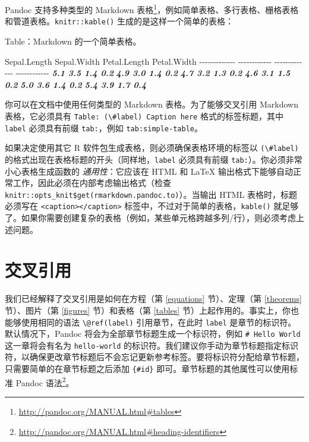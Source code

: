 \documentclass[
  12pt,
]{krantz}
\newenvironment{Shaded}{\begin{snugshade}}{\end{snugshade}}
\newcommand{\InformationTok}[1]{\textcolor[rgb]{0.56,0.35,0.01}{\textbf{\textit{#1}}}}
\newcommand{\NormalTok}[1]{#1}
\renewcommand{\href}[2]{#2\footnote{\url{#1}}}
\theoremstyle{definition}
\theoremstyle{definition}
\theoremstyle{definition}
\theoremstyle{definition}
\theoremstyle{remark}
\begin{document}
Pandoc 支持多种类型的 \href{http://pandoc.org/MANUAL.html\#tables}{Markdown 表格}，例如简单表格、多行表格、栅格表格和管道表格。\texttt{knitr::kable()} 生成的是这样一个简单的表格：

\begin{Shaded}
\begin{Highlighting}[]
\NormalTok{Table：Markdown 的一个简单表格。}

\NormalTok{ Sepal.Length   Sepal.Width   Petal.Length   Petal.Width}
\NormalTok{{-}{-}{-}{-}{-}{-}{-}{-}{-}{-}{-}{-}{-}  {-}{-}{-}{-}{-}{-}{-}{-}{-}{-}{-}{-}  {-}{-}{-}{-}{-}{-}{-}{-}{-}{-}{-}{-}{-}  {-}{-}{-}{-}{-}{-}{-}{-}{-}{-}{-}{-}}
\InformationTok{          5.1           3.5            1.4           0.2}
\InformationTok{          4.9           3.0            1.4           0.2}
\InformationTok{          4.7           3.2            1.3           0.2}
\InformationTok{          4.6           3.1            1.5           0.2}
\InformationTok{          5.0           3.6            1.4           0.2}
\InformationTok{          5.4           3.9            1.7           0.4}
\end{Highlighting}
\end{Shaded}

你可以在文档中使用任何类型的 Markdown 表格。为了能够交叉引用 Markdown 表格，它必须具有 \texttt{Table:\ (\textbackslash{}\#label)\ Caption\ here} 格式的标签标题，其中 \texttt{label} 必须具有前缀 \texttt{tab:}，例如 \texttt{tab:simple-table}。

如果决定使用其它 R 软件包生成表格，则必须确保表格环境的标签以 \texttt{(\textbackslash{}\#label)} 的格式出现在表格标题的开头（同样地，\texttt{label} 必须具有前缀 \texttt{tab:}）。你必须非常小心表格生成函数的 \emph{通用性}：它应该在 HTML 和 LaTeX 输出格式下能够自动正常工作，因此必须在内部考虑输出格式（检查 \texttt{knitr::opts\_knit\$get(\textquotesingle{}rmarkdown.pandoc.to\textquotesingle{})}）。当输出 HTML 表格时，标题必须写在 \texttt{\textless{}caption\textgreater{}\textless{}/caption\textgreater{}} 标签中，不过对于简单的表格，\texttt{kable()} 就足够了。如果你需要创建复杂的表格（例如，某些单元格跨越多列/行），则必须考虑上述问题。

\section{交叉引用}\label{cross-references}

我们已经解释了交叉引用是如何在方程（第 \ref{equations} 节）、定理（第 \ref{theorems} 节）、图片（第 \ref{figures} 节）和表格（第 \ref{tables} 节）上起作用的。事实上，你也能够使用相同的语法 \texttt{\textbackslash{}@ref(label)} 引用章节，在此时 \texttt{label} 是章节的标识符。默认情况下，Pandoc 将会为全部章节标题生成一个标识符，例如 \texttt{\#\ Hello\ World} 这一章将会有名为 \texttt{hello-world} 的标识符。我们建议你手动为章节标题指定标识符，以确保更改章节标题后不会忘记更新参考标签。要将标识符分配给章节标题，只需要简单的在章节标题之后添加 \texttt{\{\#id\}} 即可。章节标题的其他属性可以使用标准 \href{http://pandoc.org/MANUAL.html\#heading-identifiers}{Pandoc 语法}。
\end{document}
